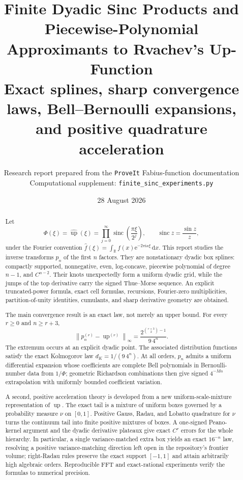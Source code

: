 \documentclass[11pt]{article}
\title{\bfseries Finite Dyadic Sinc Products and Piecewise-Polynomial\\
Approximants to Rvachev's Up-Function\\[0.5em]
\large Exact splines, sharp convergence laws, Bell--Bernoulli expansions,\\
and positive quadrature acceleration}
\author{Research report prepared from the \texttt{ProveIt} Fabius-function documentation\\
\small Computational supplement: \texttt{finite\_sinc\_experiments.py}}
\date{28 August 2026}
\theoremstyle{definition}
\theoremstyle{remark}
\newcommand{\R}{\mathbb R}
\newcommand{\Up}{\operatorname{up}}
\newcommand{\sinc}{\operatorname{sinc}}
\newcommand{\dd}{\,\mathrm d}
\newcommand{\norm}[1]{\left\lVert #1\right\rVert}
\newcommand{\e}{\mathrm e}
\newcommand{\ii}{\mathrm i}
\begin{document}
\maketitle

\begin{abstract}
Let
\[
 \Phi(\xi)=\widehat{\Up}(\xi)
 =\prod_{j=0}^{\infty}\sinc\!\left(\frac{\pi\xi}{2^j}\right),
 \qquad \sinc z=\frac{\sin z}{z},
\]
under the Fourier convention
$\widehat f(\xi)=\int_{\R}f(x)\e^{-2\pi\ii x\xi}\dd x$.
This report studies the inverse transforms $p_n$ of the first $n$ factors.
They are nonstationary dyadic box splines: compactly supported, nonnegative,
even, log-concave, piecewise polynomial of degree $n-1$, and $C^{n-2}$.
Their knots unexpectedly form a uniform dyadic grid, while the jumps of the
top derivative carry the signed Thue--Morse sequence.  An explicit truncated-power
formula, exact cell formulas, recursions, Fourier-zero multiplicities, partition-of-unity
identities, cumulants, and sharp derivative geometry are obtained.

The main convergence result is an exact law, not merely an upper bound.  For every
$r\ge0$ and $n\ge r+3$,
\[
 \norm{p_n^{(r)}-\Up^{(r)}}_{\infty}
 =\frac{2^{\binom{r+3}{2}-1}}{9\,4^n}.
\]
The extremum occurs at an explicit dyadic point.  The associated distribution
functions satisfy the exact Kolmogorov law $d_K=1/(9\,4^n)$.  At all orders,
$p_n$ admits a uniform differential expansion whose coefficients are complete Bell
polynomials in Bernoulli-number data from $1/\Phi$; geometric Richardson combinations
then give signed $4^{-Mn}$ extrapolation with uniformly bounded coefficient variation.

A second, positive acceleration theory is developed from a new uniform-scale-mixture
representation of $\Up$.  The exact tail is a mixture of uniform boxes governed by a
probability measure $\nu$ on $[0,1]$.  Positive Gauss, Radau, and Lobatto quadrature for
$\nu$ turns the continuum tail into finite positive mixtures of boxes.  A one-signed
Peano-kernel argument and the dyadic derivative plateaux give exact $C^r$ errors for the
whole hierarchy.  In particular, a single variance-matched extra box yields an exact
$16^{-n}$ law, resolving a positive variance-matching direction left open in the
repository's frontier volume; right-Radau rules preserve the exact support $[-1,1]$
and attain arbitrarily high algebraic orders.  Reproducible FFT and exact-rational
experiments verify the formulas to numerical precision.
\end{abstract}
\end{document}
